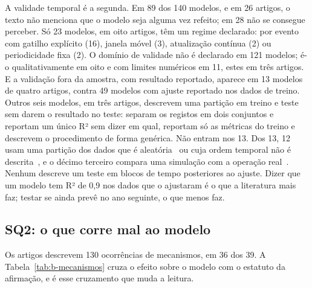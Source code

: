 A validade temporal é a segunda. Em 89 dos 140 modelos, e em 26 artigos, o
texto não menciona que o modelo seja alguma vez refeito; em 28 não se
consegue perceber. Só 23 modelos, em oito artigos, têm um regime declarado:
por evento com gatilho explícito (16), janela móvel (3), atualização
contínua (2) ou periodicidade fixa (2). O domínio de validade não é
declarado em 121 modelos; é-o qualitativamente em oito e com limites numéricos
em 11, estes em três artigos. E a validação fora da amostra, com resultado reportado, aparece em 13
modelos de quatro artigos, contra 49 modelos com ajuste reportado nos dados
de treino. Outros seis modelos, em três artigos, descrevem uma partição em
treino e teste sem darem o resultado no teste: \textcite{Velazquez2013}
separam os registos em dois conjuntos e reportam um único R² sem dizer em
qual, \textcite{Khalid2024b} reportam só as métricas do treino e
\textcite{Tarasovskii2014} descrevem o procedimento de forma genérica. Não entram nos 13. Dos 13, 12 usam uma
partição dos dados que é aleatória~\cite{Moghadasi2025,ElMaghraby2024} ou
cuja ordem temporal não é descrita~\cite{Hamedi2019}, e o décimo
terceiro compara uma simulação com a operação real~\cite{Almanza2025}.
Nenhum descreve um teste em blocos de tempo posteriores ao ajuste. Dizer que um modelo tem R² de 0,9 nos dados que o ajustaram é o
que a literatura mais faz; testar se ainda prevê no ano seguinte, o que
menos faz.

\subsection{SQ2: o que corre mal ao modelo}
\label{sec:b-mecanismos}

Os artigos descrevem 130 ocorrências de mecanismos, em 36 dos 39. A
Tabela~\ref{tab:b-mecanismos} cruza o efeito sobre o modelo com o estatuto
da afirmação, e é esse cruzamento que muda a leitura.

